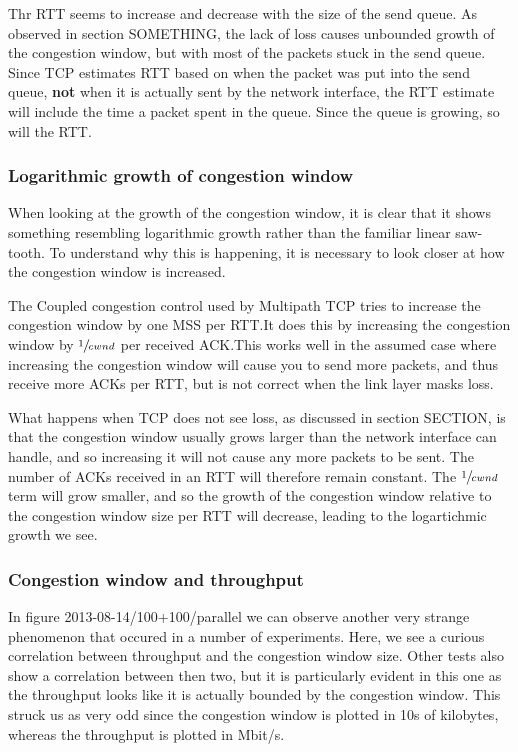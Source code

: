 Thr RTT seems to increase and decrease with the
size of the send queue. As observed in section SOMETHING, the lack of loss     %
causes unbounded growth of the congestion window, but with most of the
packets stuck in the send queue. Since TCP estimates RTT based on when the
packet was put into the send queue, \textbf{not} when it is actually sent by the
network interface, the RTT estimate will include the time a packet spent in the queue. Since
the queue is growing, so will the RTT.

\subsubsection{Logarithmic growth of congestion window}
When looking at the growth of the congestion window, it is clear that it shows
something resembling logarithmic growth rather than the familiar linear
saw-tooth. To understand why this is happening, it is necessary to look closer at
how the congestion window is increased.

The Coupled congestion control used by Multipath TCP tries to increase the congestion
window by one MSS per RTT.\@ It does this by increasing the congestion window by
$\sfrac{1}{cwnd}$ per received ACK.\@ This works well in the assumed case where
increasing the congestion window will cause you to send more packets, and thus
receive more ACKs per RTT, but is not correct when the link layer masks loss.

What happens when TCP does not see loss, as discussed in section SECTION, is   %
that the congestion window usually grows larger than the network interface can handle, and so increasing it will not cause any more packets to be sent. The number of ACKs received in an RTT will therefore remain constant. The
$\sfrac{1}{cwnd}$ term will grow smaller, and so the growth
of the congestion window relative to the congestion window size per RTT will
decrease, leading to the logartichmic growth we see.

\subsubsection{Congestion window and throughput}
In figure 2013-08-14/100+100/parallel we can observe another very strange      %
phenomenon that occured in a number of experiments. Here, we see a curious
correlation between throughput and the congestion window size. Other tests also
show a correlation between then two, but it is particularly evident in this one
as the throughput looks like it is actually bounded by the congestion window.
This struck us as very odd since the congestion window is plotted in 10s of
kilobytes, whereas the throughput is plotted in Mbit/s.


